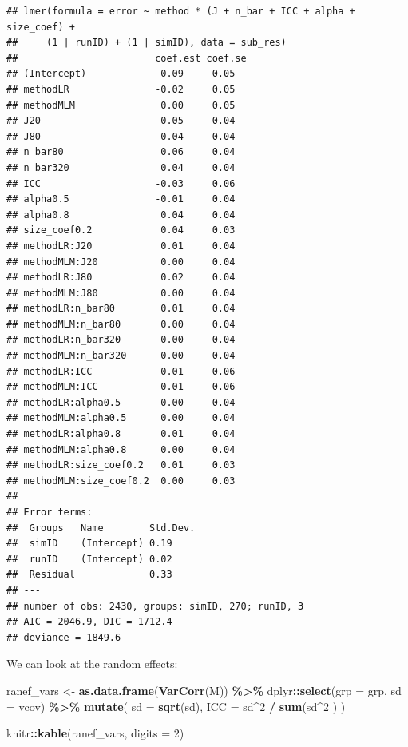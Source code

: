 \documentclass[
]{book}
\newenvironment{Shaded}{\begin{snugshade}}{\end{snugshade}}
\newcommand{\AttributeTok}[1]{\textcolor[rgb]{0.13,0.29,0.53}{#1}}
\newcommand{\DecValTok}[1]{\textcolor[rgb]{0.00,0.00,0.81}{#1}}
\newcommand{\FunctionTok}[1]{\textcolor[rgb]{0.13,0.29,0.53}{\textbf{#1}}}
\newcommand{\NormalTok}[1]{#1}
\newcommand{\OtherTok}[1]{\textcolor[rgb]{0.56,0.35,0.01}{#1}}
\newcommand{\SpecialCharTok}[1]{\textcolor[rgb]{0.81,0.36,0.00}{\textbf{#1}}}
\begin{document}
\begin{verbatim}
## lmer(formula = error ~ method * (J + n_bar + ICC + alpha + size_coef) + 
##     (1 | runID) + (1 | simID), data = sub_res)
##                        coef.est coef.se
## (Intercept)            -0.09     0.05  
## methodLR               -0.02     0.05  
## methodMLM               0.00     0.05  
## J20                     0.05     0.04  
## J80                     0.04     0.04  
## n_bar80                 0.06     0.04  
## n_bar320                0.04     0.04  
## ICC                    -0.03     0.06  
## alpha0.5               -0.01     0.04  
## alpha0.8                0.04     0.04  
## size_coef0.2            0.04     0.03  
## methodLR:J20            0.01     0.04  
## methodMLM:J20           0.00     0.04  
## methodLR:J80            0.02     0.04  
## methodMLM:J80           0.00     0.04  
## methodLR:n_bar80        0.01     0.04  
## methodMLM:n_bar80       0.00     0.04  
## methodLR:n_bar320       0.00     0.04  
## methodMLM:n_bar320      0.00     0.04  
## methodLR:ICC           -0.01     0.06  
## methodMLM:ICC          -0.01     0.06  
## methodLR:alpha0.5       0.00     0.04  
## methodMLM:alpha0.5      0.00     0.04  
## methodLR:alpha0.8       0.01     0.04  
## methodMLM:alpha0.8      0.00     0.04  
## methodLR:size_coef0.2   0.01     0.03  
## methodMLM:size_coef0.2  0.00     0.03  
## 
## Error terms:
##  Groups   Name        Std.Dev.
##  simID    (Intercept) 0.19    
##  runID    (Intercept) 0.02    
##  Residual             0.33    
## ---
## number of obs: 2430, groups: simID, 270; runID, 3
## AIC = 2046.9, DIC = 1712.4
## deviance = 1849.6
\end{verbatim}

We can look at the random effects:

\begin{Shaded}
\begin{Highlighting}[]
\NormalTok{ranef\_vars }\OtherTok{\textless{}{-}} \FunctionTok{as.data.frame}\NormalTok{(}\FunctionTok{VarCorr}\NormalTok{(M)) }\SpecialCharTok{\%\textgreater{}\%}
\NormalTok{  dplyr}\SpecialCharTok{::}\FunctionTok{select}\NormalTok{(}\AttributeTok{grp =}\NormalTok{ grp, }\AttributeTok{sd =}\NormalTok{ vcov) }\SpecialCharTok{\%\textgreater{}\%}
  \FunctionTok{mutate}\NormalTok{( }\AttributeTok{sd =} \FunctionTok{sqrt}\NormalTok{(sd),}
          \AttributeTok{ICC =}\NormalTok{ sd}\SpecialCharTok{\^{}}\DecValTok{2} \SpecialCharTok{/} \FunctionTok{sum}\NormalTok{(sd}\SpecialCharTok{\^{}}\DecValTok{2}\NormalTok{ ) )}

\NormalTok{knitr}\SpecialCharTok{::}\FunctionTok{kable}\NormalTok{(ranef\_vars, }\AttributeTok{digits =} \DecValTok{2}\NormalTok{)}
\end{Highlighting}
\end{Shaded}
\end{document}
